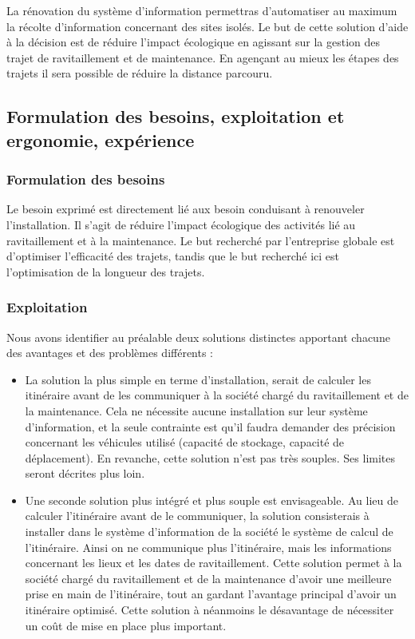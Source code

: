         La rénovation du système d'information permettras d'automatiser au maximum la récolte d'information concernant des sites isolés.
        Le but de cette solution d'aide à la décision est de réduire l'impact écologique en agissant sur la gestion des trajet de ravitaillement et de maintenance. En agençant au mieux les étapes des trajets il sera possible de réduire la distance parcouru.
        
    \subsection{Formulation des besoins, exploitation et ergonomie, expérience}
    
        \subsubsection{Formulation des besoins}
            
            Le besoin exprimé est directement lié aux besoin conduisant à renouveler l'installation. Il s'agit de réduire l'impact écologique des activités lié au ravitaillement et à la maintenance. Le but recherché par l'entreprise globale est d'optimiser l'efficacité des trajets, tandis que le but recherché ici est l'optimisation de la longueur des trajets.
            
        \subsubsection{Exploitation}
        
            Nous avons identifier au préalable deux solutions distinctes apportant chacune des avantages et des problèmes différents :
            \begin{itemize}
                \item La solution la plus simple en terme d'installation, serait de calculer les itinéraire avant de les communiquer à la société chargé du ravitaillement et de la maintenance. Cela ne nécessite aucune installation sur leur système d'information, et la seule contrainte est qu'il faudra demander des précision concernant les véhicules utilisé (capacité de stockage, capacité de déplacement).
                En revanche, cette solution n'est pas très souples. Ses limites seront décrites plus loin.

                \item Une seconde solution plus intégré et plus souple est envisageable. Au lieu de calculer l'itinéraire avant de le communiquer, la solution consisterais à installer dans le système d'information de la société le système de calcul de l'itinéraire.
                Ainsi on ne communique plus l'itinéraire, mais les informations concernant les lieux et les dates de ravitaillement.
                Cette solution permet à la société chargé du ravitaillement et de la maintenance d'avoir une meilleure prise en main de l'itinéraire, tout an gardant l'avantage principal d'avoir un itinéraire optimisé.
                Cette solution à néanmoins le désavantage de nécessiter un coût de mise en place plus important.
            \end{itemize}
        
